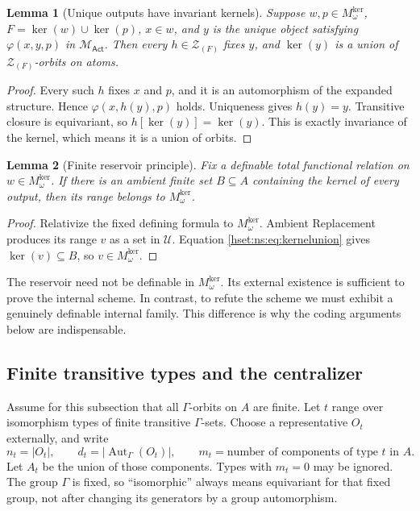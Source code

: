 \documentclass[11pt,letterpaper]{article}
\newtheorem{lemma}[lemma]{Lemma}\aliascntresetthe{lemma}
\theoremstyle{definition}
\theoremstyle{remark}
\newcommand{\Aut}{\operatorname{Aut}}
\newcommand{\kerat}{\operatorname{ker}}
\newcommand{\Mker}{M^{\mathrm{ker}}}
\newcommand{\Uk}{\mathcal U}
\newcommand{\Act}{\mathsf{Act}}
\newcommand{\MAct}{\mathcal M_{\Act}}
\newcommand{\abs}[1]{\lvert #1\rvert}
\begin{document}
\begin{lemma}[Unique outputs have invariant kernels]\label{hset:ns:lem:invariant}
Suppose $w,p\in \Mker_\omega$, $F=\kerat(w)\cup\kerat(p)$, $x\in w$, and $y$ is the unique object satisfying $\varphi(x,y,p)$ in $\MAct$. Then every $h\in \mathcal Z_{(F)}$ fixes $y$, and $\kerat(y)$ is a union of $\mathcal Z_{(F)}$-orbits on atoms.
\end{lemma}
\begin{proof}
Every such $h$ fixes $x$ and $p$, and it is an automorphism of the expanded structure. Hence $\varphi(x,h(y),p)$ holds. Uniqueness gives $h(y)=y$. Transitive closure is equivariant, so $h[\kerat(y)]=\kerat(y)$. This is exactly invariance of the kernel, which means it is a union of orbits.
\end{proof}

\begin{lemma}[Finite reservoir principle]\label{hset:ns:lem:reservoir}
Fix a definable total functional relation on $w\in \Mker_\omega$. If there is an ambient finite set $B\subseteq A$ containing the kernel of every output, then its range belongs to $\Mker_\omega$.
\end{lemma}
\begin{proof}
Relativize the fixed defining formula to $\Mker_\omega$. Ambient Replacement produces its range $v$ as a set in $\Uk$. Equation \eqref{hset:ns:eq:kernelunion} gives $\kerat(v)\subseteq B$, so $v\in \Mker_\omega$.
\end{proof}
The reservoir need not be definable in $\Mker_\omega$. Its external existence is sufficient to prove the internal scheme. In contrast, to refute the scheme we must exhibit a genuinely definable internal family. This difference is why the coding arguments below are indispensable.

\subsection{Finite transitive types and the centralizer}
Assume for this subsection that all $\Gamma$-orbits on $A$ are finite. Let $t$ range over isomorphism types of finite transitive $\Gamma$-sets. Choose a representative $O_t$ externally, and write
\[
 n_t=\abs{O_t},\qquad d_t=\abs{\Aut_\Gamma(O_t)},\qquad
 m_t=\text{number of components of type }t\text{ in }A.
\]
Let $A_t$ be the union of those components. Types with $m_t=0$ may be ignored. The group $\Gamma$ is fixed, so ``isomorphic'' always means equivariant for that fixed group, not after changing its generators by a group automorphism.
\end{document}
